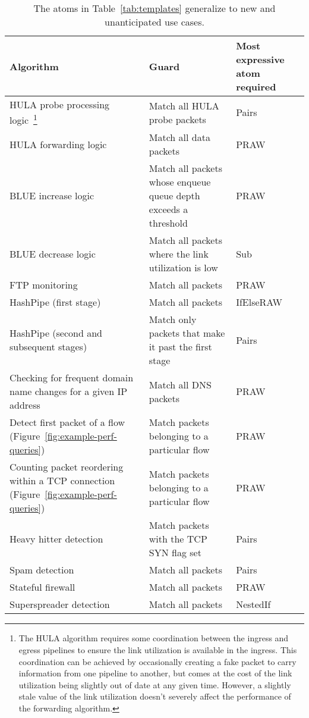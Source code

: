 \begin{savenotes}
\begin{table*}[!t]
\centering
\begin{small}
  \begin{tabular}{|p{}|p{} | p{}|}
\hline
Algorithm & Guard & Most expressive atom required\\
\hline
HULA probe processing logic~\cite{hula}\footnote{The HULA algorithm requires
some coordination between the ingress and egress pipelines to ensure the link
utilization is available in the ingress. This coordination can be achieved by
occasionally creating a fake packet to carry information from one pipeline to
another, but comes at the cost of the link utilization being slightly out of
date at any given time. However, a slightly stale value of the link utilization
doesn't severely affect the performance of the forwarding algorithm.} & Match
all HULA probe packets & Pairs \\
\hline
HULA forwarding logic~\cite{hula} & Match all data packets & PRAW \\
\hline
BLUE increase logic~\cite{blue} & Match all packets whose enqueue queue depth exceeds a threshold & PRAW \\
\hline
BLUE decrease logic~\cite{blue} & Match all packets where the link utilization is low & Sub \\
\hline
FTP monitoring~\cite{snap} & Match all packets & PRAW \\
\hline
HashPipe (first stage)~\cite{hashpipe} & Match all packets & IfElseRAW \\
\hline
HashPipe (second and subsequent stages)~\cite{hashpipe} & Match only packets that make it past the first stage & Pairs\\
\hline
Checking for frequent domain name changes for a given IP address~\cite{snap} & Match all DNS packets & PRAW \\
\hline
Detect first packet of a flow (Figure~\ref{fig:example-perf-queries}) & Match packets belonging to a particular flow & PRAW \\
\hline
Counting packet reordering within a TCP connection (Figure~\ref{fig:example-perf-queries}) & Match packets belonging to a particular flow & PRAW \\
\hline
Heavy hitter detection~\cite{snap} & Match packets with the TCP SYN flag set & Pairs \\
\hline
Spam detection~\cite{snap} & Match all packets & Pairs \\
\hline
Stateful firewall~\cite{snap} & Match all packets & PRAW \\
\hline
Superspreader detection~\cite{snap} & Match all packets & NestedIf \\
\hline
\end{tabular}
\caption{The atoms in Table~\ref{tab:templates} generalize to new and unanticipated use cases.}
\label{tab:atoms_generalize}
\end{small}
\end{table*}
\end{savenotes}
